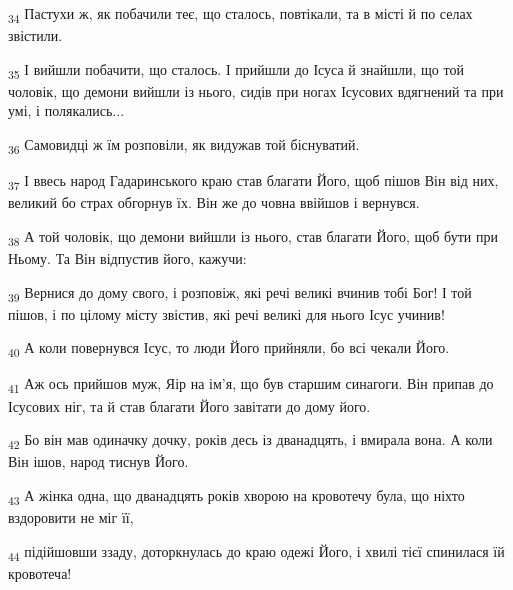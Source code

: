\begin{tcolorbox}
\textsubscript{34} Пастухи ж, як побачили теє, що сталось, повтікали, та в місті й по селах звістили.
\end{tcolorbox}
\begin{tcolorbox}
\textsubscript{35} І вийшли побачити, що сталось. І прийшли до Ісуса й знайшли, що той чоловік, що демони вийшли із нього, сидів при ногах Ісусових вдягнений та при умі, і полякались...
\end{tcolorbox}
\begin{tcolorbox}
\textsubscript{36} Самовидці ж їм розповіли, як видужав той біснуватий.
\end{tcolorbox}
\begin{tcolorbox}
\textsubscript{37} І ввесь народ Гадаринського краю став благати Його, щоб пішов Він від них, великий бо страх обгорнув їх. Він же до човна ввійшов і вернувся.
\end{tcolorbox}
\begin{tcolorbox}
\textsubscript{38} А той чоловік, що демони вийшли із нього, став благати Його, щоб бути при Ньому. Та Він відпустив його, кажучи:
\end{tcolorbox}
\begin{tcolorbox}
\textsubscript{39} Вернися до дому свого, і розповіж, які речі великі вчинив тобі Бог! І той пішов, і по цілому місту звістив, які речі великі для нього Ісус учинив!
\end{tcolorbox}
\begin{tcolorbox}
\textsubscript{40} А коли повернувся Ісус, то люди Його прийняли, бо всі чекали Його.
\end{tcolorbox}
\begin{tcolorbox}
\textsubscript{41} Аж ось прийшов муж, Яір на ім'я, що був старшим синагоги. Він припав до Ісусових ніг, та й став благати Його завітати до дому його.
\end{tcolorbox}
\begin{tcolorbox}
\textsubscript{42} Бо він мав одиначку дочку, років десь із дванадцять, і вмирала вона. А коли Він ішов, народ тиснув Його.
\end{tcolorbox}
\begin{tcolorbox}
\textsubscript{43} А жінка одна, що дванадцять років хворою на кровотечу була, що ніхто вздоровити не міг її,
\end{tcolorbox}
\begin{tcolorbox}
\textsubscript{44} підійшовши ззаду, доторкнулась до краю одежі Його, і хвилі тієї спинилася їй кровотеча!
\end{tcolorbox}
